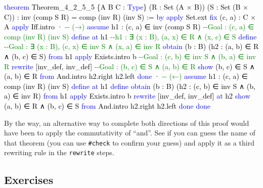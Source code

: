 \documentclass[
  letterpaper,
  DIV=11,
  numbers=noendperiod]{scrreprt}
\newenvironment{Shaded}{\begin{snugshade}}{\end{snugshade}}
\newcommand{\CommentTok}[1]{\textcolor[rgb]{0.37,0.37,0.37}{#1}}
\newcommand{\KeywordTok}[1]{\textcolor[rgb]{0.00,0.23,0.31}{#1}}
\newcommand{\NormalTok}[1]{\textcolor[rgb]{0.00,0.23,0.31}{#1}}
\renewcommand{\NormalTok}[1]{\textcolor[HTML]{000000}{#1}}
\renewcommand{\KeywordTok}[1]{\textcolor[HTML]{0000FF}{#1}}
\renewcommand{\CommentTok}[1]{\textcolor[HTML]{008000}{#1}}
\theoremstyle{remark}
\begin{document}
\begin{Shaded}
\begin{Highlighting}[]
\KeywordTok{theorem}\NormalTok{ Theorem\_4\_2\_5\_5 \{A B C : }\KeywordTok{Type}\NormalTok{\}}
\NormalTok{    (R : Set (A × B)) (S : Set (B × C)) :}
\NormalTok{    inv (comp S R) = comp (inv R) (inv S) := }\KeywordTok{by}
  \KeywordTok{apply}\NormalTok{ Set.ext}
  \KeywordTok{fix}\NormalTok{ (c, a) : C × A}
  \KeywordTok{apply}\NormalTok{ Iff.intro}
\NormalTok{  · }\CommentTok{{-}{-} (→)}
    \KeywordTok{assume}\NormalTok{ h1 : (c, a) ∈ inv (comp S R)}
                      \CommentTok{{-}{-}Goal : (c, a) ∈ comp (inv R) (inv S)}
    \KeywordTok{define} \KeywordTok{at}\NormalTok{ h1      }\CommentTok{{-}{-}h1 : ∃ (x : B), (a, x) ∈ R ∧ (x, c) ∈ S}
    \KeywordTok{define}            \CommentTok{{-}{-}Goal : ∃ (x : B), (c, x) ∈ inv S ∧ (x, a) ∈ inv R}
    \KeywordTok{obtain}\NormalTok{ (b : B) (h2 : (a, b) ∈ R ∧ (b, c) ∈ S) }\KeywordTok{from}\NormalTok{ h1}
    \KeywordTok{apply}\NormalTok{ Exists.intro b         }\CommentTok{{-}{-}Goal : (c, b) ∈ inv S ∧ (b, a) ∈ inv R}
    \KeywordTok{rewrite}\NormalTok{ [inv\_def, inv\_def] }\CommentTok{{-}{-}Goal : (b, c) ∈ S ∧ (a, b) ∈ R}
    \KeywordTok{show}\NormalTok{ (b, c) ∈ S ∧ (a, b) ∈ R }\KeywordTok{from}\NormalTok{ And.intro h2.right h2.left}
    \KeywordTok{done}
\NormalTok{  · }\CommentTok{{-}{-} (←)}
    \KeywordTok{assume}\NormalTok{ h1 : (c, a) ∈ comp (inv R) (inv S)}
    \KeywordTok{define} \KeywordTok{at}\NormalTok{ h1}
    \KeywordTok{define}
    \KeywordTok{obtain}\NormalTok{ (b : B) (h2 : (c, b) ∈ inv S ∧ (b, a) ∈ inv R) }\KeywordTok{from}\NormalTok{ h1}
    \KeywordTok{apply}\NormalTok{ Exists.intro b}
    \KeywordTok{rewrite}\NormalTok{ [inv\_def, inv\_def] }\KeywordTok{at}\NormalTok{ h2}
    \KeywordTok{show}\NormalTok{ (a, b) ∈ R ∧ (b, c) ∈ S }\KeywordTok{from}\NormalTok{ And.intro h2.right h2.left}
    \KeywordTok{done}
  \KeywordTok{done}
\end{Highlighting}
\end{Shaded}

By the way, an alternative way to complete both directions of this proof
would have been to apply the commutativity of ``and''. See if you can
guess the name of that theorem (you can use \texttt{\#check} to confirm
your guess) and apply it as a third rewriting rule in the
\texttt{rewrite} steps.

\hypertarget{exercises-6}{%
\subsection{Exercises}\label{exercises-6}}
\end{document}
